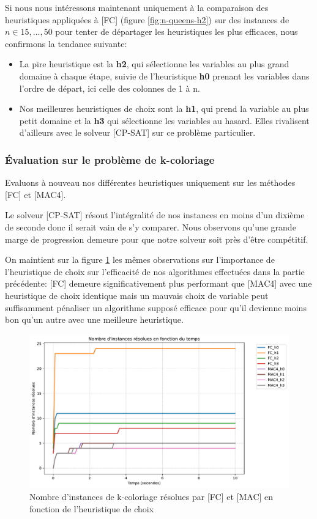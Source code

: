 \documentclass[14pt]{article}
\begin{document}
Si nous nous intéressons maintenant uniquement à la comparaison des heuristiques appliquées à [FC] (figure \ref{fig:n-queens-h2}) sur des instances de $n \in 15,...,50$ pour tenter de départager les heuristiques les plus efficaces, nous confirmons la tendance suivante:

\begin{itemize}
	\item La pire heuristique est la \textbf{h2}, qui sélectionne les variables au plus grand domaine à chaque étape, suivie de l'heuristique \textbf{h0} prenant les variables dans l'ordre de départ, ici celle des colonnes de 1 à n.
	\item Nos meilleures heuristiques de choix sont la \textbf{h1}, qui prend la variable au plus petit domaine et la \textbf{h3} qui sélectionne les variables au hasard. Elles rivalisent d'ailleurs avec le solveur [CP-SAT] sur ce problème particulier.
\end{itemize}


\subsubsection{Évaluation sur le problème de k-coloriage}

Evaluons à nouveau nos différentes heuristiques uniquement sur les méthodes [FC] et [MAC4].

Le solveur [CP-SAT] résout l'intégralité de nos instances en moins d'un dixième de seconde donc il serait vain de s'y comparer. Nous observons qu'une grande marge de progression demeure pour que notre solveur soit près d'être compétitif.

On maintient sur la figure \ref{fig:coloriage-h} les mêmes observations sur l'importance de l'heuristique de choix sur l'efficacité de nos algorithmes effectuées dans la partie précédente: [FC] demeure significativement plus performant que [MAC4] avec une heuristique de choix identique mais un mauvais choix de variable peut suffisamment pénaliser un algorithme supposé efficace pour qu'il devienne moins bon qu'un autre avec une meilleure heuristique.

\begin{figure}[H]
	\centering
	\includegraphics[width=1\textwidth]{Images/graph_coloring-h.pdf}
	\caption{Nombre d'instances de k-coloriage résolues par [FC] et [MAC] en fonction de l'heuristique de choix}
	\label{fig:coloriage-h}
\end{figure}
\end{document}
